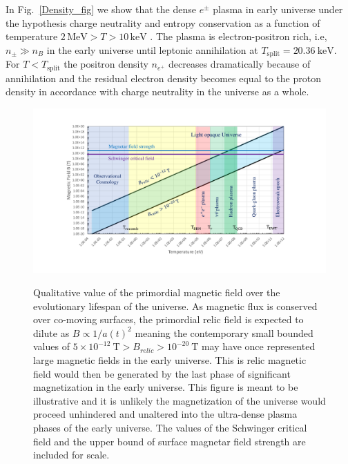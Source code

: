 \documentclass[Universe,article,submit,moreauthors,pdftex]{Definitions/mdpi}
\newcommand*{\rf}[1]{Fig.~{\ref{#1}}}
\begin{document}
In \rf{Density_fig} we show that the dense $e^{\pm}$ plasma in early universe under the hypothesis charge neutrality and entropy conservation as a function of temperature $2\,\mathrm{MeV}>T>10\,\mathrm{keV}$ \cite{Chris:2023abc}. The plasma is electron-positron rich, i.e, $n_{\pm}\gg n_B$ in the early universe until leptonic annihilation at $T_{\mathrm{split}} = 20.36\ \mathrm{keV}$. For $T<T_{\mathrm{split}}$ the positron density $n_{e^+}$ decreases dramatically because of annihilation and the residual electron density becomes equal to the proton density in accordance with charge neutrality in the universe as a whole.
\begin{figure}[htbp]
  \centering  \includegraphics[trim=110 50 120 40,clip,width=\textwidth]{./plots/relic_plot.PDF}
  \label{relic_plot}
  \caption{Qualitative value of the primordial magnetic field over the evolutionary lifespan of the universe. As magnetic flux is conserved over co-moving surfaces, the primordial relic field is expected to dilute as $B\propto1/a(t)^{2}$ meaning the contemporary small bounded values of $5\times10^{-12}\ \mathrm{T}>B_{relic}>10^{-20}\ \mathrm{T}$ may have once represented large magnetic fields in the early universe. This is relic magnetic field would then be generated by the last phase of significant magnetization in the early universe. This figure is meant to be illustrative and it is unlikely the magnetization of the universe would proceed unhindered and unaltered into the ultra-dense plasma phases of the early universe. The values of the Schwinger critical field and the upper bound of surface magnetar field strength are included for scale.}
\end{figure}
\end{document}
